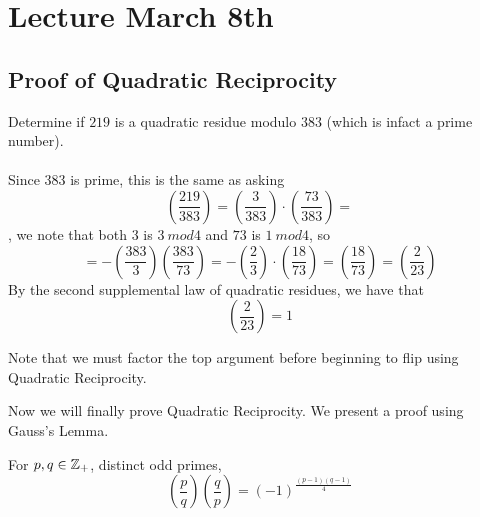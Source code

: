 \section{Lecture March 8th}

\subsection{Proof of Quadratic Reciprocity}

\begin{example}
Determine if $219$ is a quadratic residue modulo $383$ (which is infact a prime number).\\\\
Since $383$ is prime, this is the same as asking
\[(\frac{219}{383}) = (\frac{3}{383}) \cdot (\frac{73}{383}) = \]
, we note that both $3$ is $3\ mod 4$ and $73$ is $1\ mod 4$, so
\[= -(\frac{383}{3}) (\frac{383}{73}) = -(\frac{2}{3}) \cdot (\frac{18}{73}) = (\frac{18}{73}) = (\frac{2}{23})\]
By the second supplemental law of quadratic residues, we have that
\[(\frac{2}{23}) = 1\]
\end{example}

\begin{remark}
Note that we must factor the top argument before beginning to flip using Quadratic Reciprocity.
\end{remark}

\noindent Now we will finally prove Quadratic Reciprocity. We present a proof using Gauss's Lemma.

\begin{theorem}
For $p, q \in \mathbb{Z}_+$, distinct odd primes,
\[(\frac{p}{q})(\frac{q}{p}) = (-1)^{\frac{(p-1)(q-1)}{4}}\]
\end{theorem}

